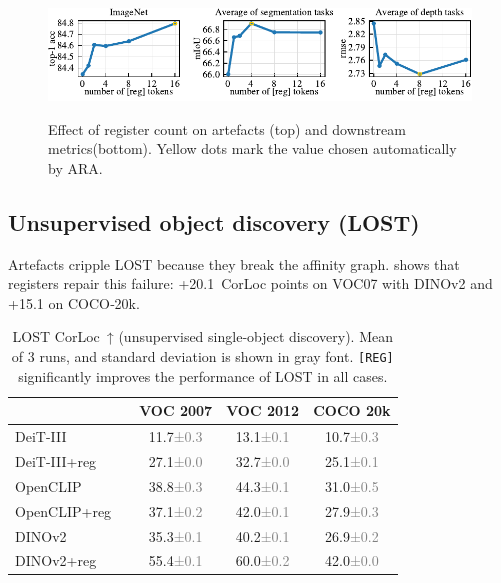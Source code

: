 \documentclass{article}
\newcommand{\RegTok}{\texttt{[REG]}\xspace}
\newcommand{\citep}{\parencite}
\newcommand{\OURS}{\textsc{ARA}\xspace}
\newcommand{\std}[1]{\textcolor{gray}{\scriptsize{±#1}}}
\begin{document}
\begin{figure}[t]
\begin{tabular}{*{7}{>{\centering\arraybackslash}m{}@{}}}
  \end{tabular} \\
  \vspace{0.3em}
  \includegraphics{resources/ablation_n_reg.pdf}
  \caption{
    Effect of register count on artefacts (top) and downstream metrics(bottom).  Yellow dots mark the value chosen automatically by \OURS.}
  \label{fig:scores_n_reg}
\end{figure}



\subsection{Unsupervised object discovery (LOST)}
Artefacts cripple LOST \citep{simeoniLocalizingObjectsSelfsupervised2021} because they break the affinity graph.
 shows that registers repair this failure: +20.1 CorLoc points on VOC07 with DINOv2 and +15.1 on COCO‑20k.  

\begin{table}[t]
  \centering
  \caption{LOST CorLoc ↑ (unsupervised single‑object discovery). Mean of 3 runs, and standard deviation is shown in gray font. \RegTok significantly improves the performance of LOST in all cases.}
  \vspace{0.3em}
  \begin{tabular}{@{}l c ccc@{}}
  	\toprule
  	            && VOC 2007 & VOC 2012  & COCO 20k \\
  	\midrule
    DeiT-III      && 11.7\std{0.3} & 13.1\std{0.1} & 10.7\std{0.3} \\
    DeiT-III+reg  && 27.1\std{0.0} & 32.7\std{0.0} & 25.1\std{0.1} \\
    \midrule
    OpenCLIP      && 38.8\std{0.3} & 44.3\std{0.1} & 31.0\std{0.5} \\
    OpenCLIP+reg  && 37.1\std{0.2} & 42.0\std{0.1} & 27.9\std{0.3} \\
    \midrule
    DINOv2        && 35.3\std{0.1} & 40.2\std{0.1} & 26.9\std{0.2} \\
    DINOv2+reg    && 55.4\std{0.1} & 60.0\std{0.2} & 42.0\std{0.0} \\
  	\bottomrule
  \end{tabular}
  \label{tab:lost}
\end{table}
\end{document}
